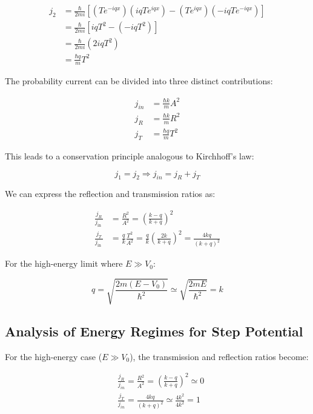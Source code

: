 \documentclass[italian]{HKNdocument}
\begin{document}
\begin{align}
j_{2} & =\frac{\hbar}{2 m i}\left[\left(T e^{-i q x}\right)\left(i q T e^{i q x}\right)-\left(T e^{i q x}\right)\left(-i q T e^{-i q x}\right)\right] \\
& =\frac{\hbar}{2 m i}\left[i q T^{2}-\left(-i q T^{2}\right)\right]  \\
& =\frac{\hbar}{2 m i}\left(2 i q T^{2}\right) \\
& =\frac{\hbar q}{m} T^{2}
\end{align}

The probability current can be divided into three distinct contributions:

\begin{align}
j_{i n} & =\frac{\hbar k}{m} A^{2} \\
j_{R} & =\frac{\hbar k}{m} R^{2}  \\
j_{T} & =\frac{\hbar q}{m} T^{2}
\end{align}

This leads to a conservation principle analogous to Kirchhoff's law:

\begin{equation}
j_{1}=j_{2} \Longrightarrow j_{i n}=j_{R}+j_{T}
\end{equation}

We can express the reflection and transmission ratios as:

\begin{align}
\frac{j_{R}}{j_{\text {in }}} & =\frac{R^{2}}{A^{2}}=\left(\frac{k-q}{k+q}\right)^{2} \\
\frac{j_{T}}{j_{\text {in }}} & =\frac{q}{k} \frac{T^{2}}{A^{2}}=\frac{q}{k}\left(\frac{2 k}{k+q}\right)^{2}=\frac{4 k q}{(k+q)^{2}}
\end{align}

For the high-energy limit where $E \gg V_{0}$:

\begin{equation}
q=\sqrt{\frac{2 m\left(E-V_{0}\right)}{\hbar^{2}}} \simeq \sqrt{\frac{2 m E}{\hbar^{2}}}=k
\end{equation}


\subsection{Analysis of Energy Regimes for Step Potential}

For the high-energy case ($E \gg V_{0}$), the transmission and reflection ratios become:

\begin{align}
& \frac{j_{R}}{j_{i n}}=\frac{R^{2}}{A^{2}}=\left(\frac{k-q}{k+q}\right)^{2} \simeq 0  \\
& \frac{j_{T}}{j_{i n}}=\frac{4 k q}{(k+q)^{2}} \simeq \frac{4 k^{2}}{4 k^{2}}=1
\end{align}
\end{document}
